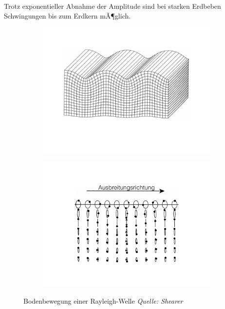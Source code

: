 Trotz exponentieller Abnahme der Amplitude sind bei starken Erdbeben Schwingungen bis zum Erdkern mÃ¶glich.


\begin{figure}[H]
	\begin{subfigure}[m]{0.5\textwidth}
		\centering
		\includegraphics[scale = 0.2]{SeismikBilder/RayleighWelle}
	\end{subfigure}
	\begin{subfigure}[m]{0.5\textwidth}
		\centering
		\includegraphics[scale = 0.2]{SeismikBilder/BodenbewegungRayleigh}
	\end{subfigure}
	\caption*{Bodenbewegung einer Rayleigh-Welle \textsl{Quelle: Shearer}}
\end{figure}

